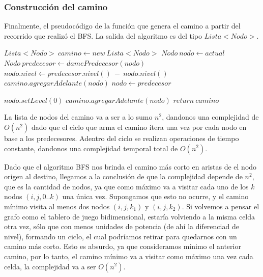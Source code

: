 \vspace{2mm}

 \subsubsection{Construcci\'on del camino}

Finalmente, el pseudoc\'odigo de la funci\'on que genera el camino a partir del recorrido que realiz\'o el BFS. La salida del algoritmo es del tipo $Lista<Nodo>$.
\vspace{2mm}
\begin{algorithmic}[1]


		\State $Lista<Nodo>\: camino \gets new\: Lista<Nodo>$
		\State $Nodo\: nodo \gets actual$
			\State $Nodo\: predecesor \gets damePredecesor(nodo)$
			\State $nodo.nivel \gets predecesor.nivel()\: -\: nodo.nivel()$
			\State $camino.agregarAdelante(nodo)$
			\State $nodo \gets predecesor$

		\EndWhile

		\State $nodo.setLevel(0)$
		\State $camino.agregarAdelante(nodo)$
		\State $return\: camino$
		
\EndProcedure
\end{algorithmic}

La lista de nodos del camino va a ser a lo sumo $n^2$, dandonos una complejidad de $O(n^2)$ dado que el ciclo que arma el camino itera una vez por cada nodo en base a los predecesores. Adentro del ciclo se realizan operaciones de tiempo constante, dandonos una complejidad temporal total de $O(n^2)$.

\vspace{2mm}

Dado que el algoritmo BFS nos brinda el camino m\'as corto en aristas de el nodo origen al destino, llegamos a la conclusi\'on de que la complejidad depende de $n^2$, que es la cantidad de nodos, ya que como m\'aximo va a visitar cada uno de los $k$ nodos $(i,j,0..k)$ una \'unica vez. Supongamos que esto no ocurre, y el camino m\'inimo visita al menos dos nodos $(i,j,k_1)$ y $(i,j,k_2)$. Si volvemos a pensar el grafo como el tablero de juego bidimensional, estar\'ia volviendo a la misma celda otra vez, s\'olo que con menos unidades de potencia (de ah\'i la diferenciad de nivel), formando un ciclo, el cual podr\'iamos retirar para quedarnos con un camino m\'as corto. Esto es absurdo, ya que consideramos m\'inimo el anterior camino, por lo tanto, el camino m\'inimo va a visitar como m\'aximo una vez cada celda, la complejidad va a ser $O(n^2)$.
 
